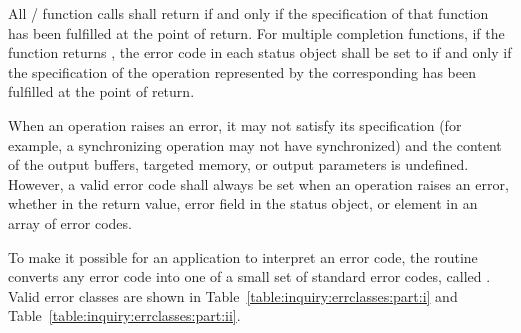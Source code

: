 All \MPI/ function calls shall return  if and only if the specification of that
function has been fulfilled at the point of return.  For multiple completion functions, if the
function returns , the error code in each status object shall be set to
 if and only if the specification of the operation represented by the
corresponding  has been fulfilled at the point of return.

When an operation raises an error, it may not satisfy its specification (for example,
a synchronizing operation may not have synchronized) and the content of the output buffers, targeted
memory, or output parameters is undefined. However, a valid error code shall always be set when an operation
raises an error, whether in the return value, error field in the status object, or element in an array of
error codes.

To make it possible for an application to interpret an error code, the routine
converts any error code into one of a small set of standard error
codes, called .
Valid error classes are shown in Table~\ref{table:inquiry:errclasses:part:i}
and Table~\ref{table:inquiry:errclasses:part:ii}.

